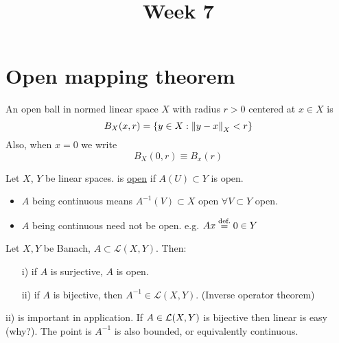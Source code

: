 \documentclass{article}
\title{Week 7}
\begin{document}
\author{\aut}
\maketitle
\section{Open mapping theorem}
\begin{definition}\nl
An open ball in normed linear space $X$ with radius $r>0$ centered at $x\in X$ is
$$
B_X(x,r)=\{y\in X:\left\|{y-x}\right\|_X<r\}
$$
Also, when $x=0$ we write 
$$
B_X(0,r)\equiv B_x(r)
$$
\end{definition}

\begin{definition}\nl
	Let $X$, $Y$ be linear spaces.  is {\underline{open}} if $A(U)\subset Y $ is open.
\end{definition}
\begin{remark}
\phantom{something}
\begin{itemize}
    \item $A$ being continuous means $A^{-1}(V)\subset{X}$ open $\forall V\subset Y$ open.
    \item $A$ being continuous need not be open. e.g. $Ax \stackrel{\text{def.}}{=} 0\in Y$
\end{itemize}
\end{remark}

\begin{theorem}\nl
\label{open mapping theorem}
	Let $X,Y$ be Banach, $A\subset\mathcal{L}(X,Y)$. Then:
	\begin{itemize}
	    \item[i)] if $A$ is surjective, $A$ is open.
	    \item[ii)] if $A$ is bijective, then $A^{-1}\in \mathcal{L}(X,Y)$. (Inverse operator theorem)
	\end{itemize}
\end{theorem}

\begin{remark}\nl
ii) is important in application. If $A\in\mathcal{L}({X},{Y})$ is bijective then  linear is easy (why?). The point is $A^{-1}$ is also bounded, or equivalently continuous.
\end{remark}
\end{document}
